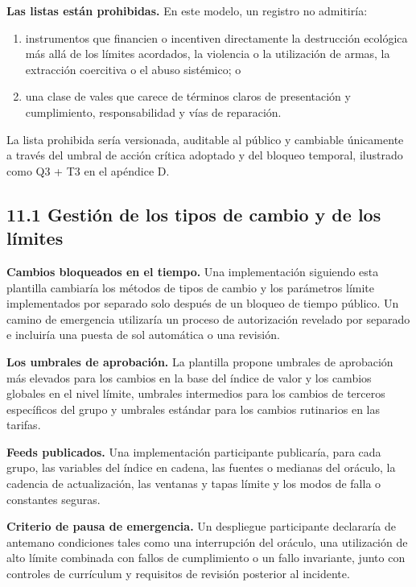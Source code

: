 \documentclass[11pt]{article}
\begin{document}
\textbf{Las listas están prohibidas.} En este modelo, un registro no admitiría:

\begin{enumerate}[leftmargin=*]
\item instrumentos que financien o incentiven directamente la destrucción ecológica más allá de los límites acordados, la violencia o la utilización de armas, la extracción coercitiva o el abuso sistémico; o
\item una clase de vales que carece de términos claros de presentación y cumplimiento, responsabilidad y vías de reparación.
\end{enumerate}
La lista prohibida sería versionada, auditable al público y cambiable únicamente a través del umbral de acción crítica adoptado y del bloqueo temporal, ilustrado como Q3 + T3 en el apéndice D.

\subsection*{11.1 Gestión de los tipos de cambio y de los límites}

\textbf{Cambios bloqueados en el tiempo.} Una implementación siguiendo esta plantilla cambiaría los métodos de tipos de cambio y los parámetros límite implementados por separado solo después de un bloqueo de tiempo público. Un camino de emergencia utilizaría un proceso de autorización revelado por separado e incluiría una puesta de sol automática o una revisión.

\textbf{Los umbrales de aprobación.} La plantilla propone umbrales de aprobación más elevados para los cambios en la base del índice de valor y los cambios globales en el nivel límite, umbrales intermedios para los cambios de terceros específicos del grupo y umbrales estándar para los cambios rutinarios en las tarifas.

\textbf{Feeds publicados.} Una implementación participante publicaría, para cada grupo, las variables del índice en cadena, las fuentes o medianas del oráculo, la cadencia de actualización, las ventanas y tapas límite y los modos de falla o constantes seguras.

\textbf{Criterio de pausa de emergencia.} Un despliegue participante declararía de antemano condiciones tales como una interrupción del oráculo, una utilización de alto límite combinada con fallos de cumplimiento o un fallo invariante, junto con controles de currículum y requisitos de revisión posterior al incidente.
\end{document}
